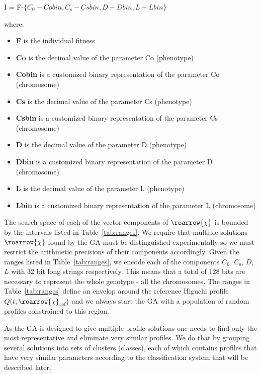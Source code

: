 \documentclass[superbib,unsortedaddress,preprint,byrevtex,aps,noshowpacs,titlepage]{revtex4}
\def\mytodo#1{$\clubsuit$\todo[noline]{$\clubsuit$\,\,\footnotesize #1}}
\def\vchi{\roarrow{\chi}}
\def\vchiref{\roarrow{\chi}_\text{ref}}
\def\Co{C_0}
\def\Cs{C_\text{s}}
\begin{document}
I = F-$\{\Co-Cobin,\Cs-Csbin, D-Dbin, L-Lbin\}$

where:

\begin{itemize}
	\item \textbf{F} is the individual fitness
	\item \textbf{Co} is the decimal value of the parameter Co (phenotype)
	\item \textbf{Cobin} is a customized binary representation of the parameter Co (chromosome)
	\item \textbf{Cs} is the decimal value of the parameter Cs (phenotype)
	\item \textbf{Csbin} is a customized binary representation of the parameter Cs (chromosome)
	\item \textbf{D} is the decimal value of the parameter D (phenotype)
	\item \textbf{Dbin} is a customized binary representation of the parameter D (chromosome)
	\item \textbf{L} is the decimal value of the parameter L (phenotype)
	\item \textbf{Lbin} is a customized binary representation of the parameter L (chromosome)
\end{itemize}

The search space of each of the vector components of $\vchi$ is bounded by the intervals listed 
in Table~\ref{tab:ranges}. 
We require that multiple solutions $\vchi$ found by the GA must be 
distinguished experimentally so we must restrict the arithmetic precisions of their components 
accordingly. 
Given the ranges listed in Table~\ref{tab:ranges}, we encode each of the components $\Co$, $\Cs$, $D$, $L$ with $32$ bit long strings respectively.
This means that a total of $128$ bits are necessary to represent the whole genotype - all the chromosomes.
The ranges in Table~\ref{tab:ranges} define an envelop around the reference Higuchi profile 
$Q(t;\vchiref)$ and we always start the GA with a population of random profiles constrained to
this region.

As the GA is designed to give multiple profile solutions one needs to find only the most 
representative and eliminate very similar profiles. 
We do that by grouping several solutions into sets of clusters (classes), each of which contains 
profiles that have very similar parameters according to the classification system%
 that will be described later.
\end{document}
